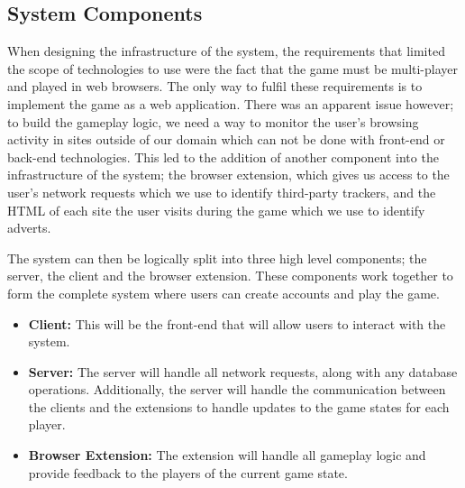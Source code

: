 \documentclass{l4proj}
\begin{document}
\subsection{System Components}
When designing the infrastructure of the system, the requirements that limited the scope of technologies to use were the fact that the game must be multi-player and played in web browsers. The only way to fulfil these requirements is to implement the game as a web application. There was an apparent issue however; to build the gameplay logic, we need a way to monitor the user's browsing activity in sites outside of our domain which can not be done with front-end or back-end technologies. This led to the addition of another component into the infrastructure of the system; the browser extension, which gives us access to the user's network requests which we use to identify third-party trackers, and the HTML of each site the user visits during the game which we use to identify adverts.

The system can then be logically split into three high level components; the server, the client and the browser extension. These components work together to form the complete system where users can create accounts and play the game.
\begin{itemize}
    \item
    \textbf{Client:} This will be the front-end that will allow users to interact with the system.
    \item
    \textbf{Server:} The server will handle all network requests, along with any database operations. Additionally, the server will handle the communication between the clients and the extensions to handle updates to the game states for each player.
    \item
    \textbf{Browser Extension:} The extension will handle all gameplay logic and provide feedback to the players of the current game state.
\end{itemize}
\end{document}

